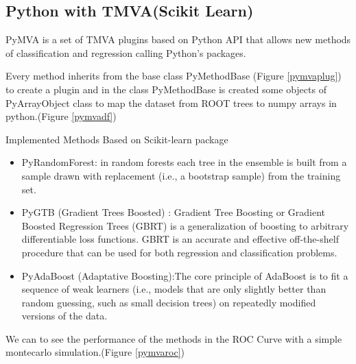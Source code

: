\documentclass[a4paper]{jpconf}
\begin{document}
\clearpage
\subsection{Python with TMVA(Scikit Learn)} \label{PYMVA}
PyMVA is a set of TMVA plugins based on Python API that
allows new methods of classification and regression calling
Python's packages.

Every method inherits from the base class PyMethodBase (Figure \ref{pymvaplug})
to create a plugin and in the class PyMethodBase is created some objects of PyArrayObject class to map
the dataset from ROOT trees to numpy arrays in python.(Figure \ref{pymvadf}) 

Implemented Methods Based on Scikit-learn package
\begin{itemize}
\item PyRandomForest: in random forests each tree in the ensemble is built from a sample drawn with replacement (i.e., a bootstrap sample) from the training set.
\item PyGTB (Gradient Trees Boosted) : Gradient Tree Boosting or Gradient Boosted Regression Trees (GBRT) is a generalization of boosting to arbitrary differentiable loss
functions. GBRT is an accurate and effective off-the-shelf procedure that can be used for both regression and classification problems.
\item PyAdaBoost (Adaptative Boosting):The core principle of AdaBoost is to fit a sequence of weak learners (i.e., models that are only slightly better than random guessing, such as small
decision trees) on repeatedly modified versions of the data. 
\end{itemize}

We can to see the performance of the methods in the ROC Curve with a simple montecarlo simulation.(Figure \ref{pymvaroc})
\end{document}
